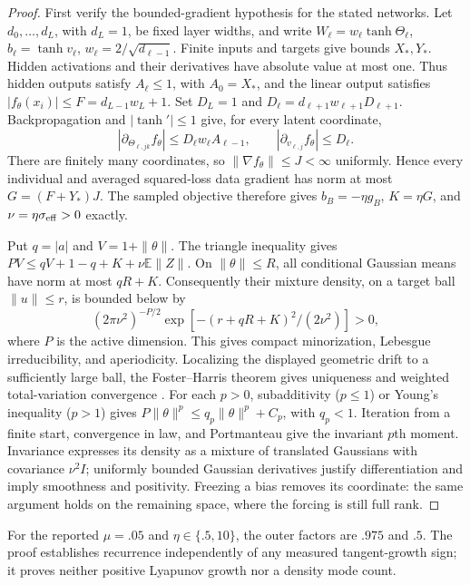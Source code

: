 \begin{proof}
First verify the bounded-gradient hypothesis for the stated networks.
Let $d_0,\ldots,d_L$, with $d_L=1$, be fixed layer widths, and write
$W_\ell=w_\ell\tanh\Theta_\ell$, $b_\ell=\tanh v_\ell$,
$w_\ell=2/\sqrt{d_{\ell-1}}$.
Finite inputs and targets give bounds $X_*,Y_*$. Hidden activations
and their derivatives have absolute value at most one. Thus hidden
outputs satisfy $A_\ell\le1$, with $A_0=X_*$, and the linear output
satisfies $|f_\theta(x_i)|\le F=d_{L-1}w_L+1$.
Set $D_L=1$ and $D_\ell=d_{\ell+1}w_{\ell+1}D_{\ell+1}$.
Backpropagation and $|\tanh'|\le1$ give, for every latent coordinate,
\[
 |\partial_{\Theta_{\ell,jk}}f_\theta|
 \le D_\ell w_\ell A_{\ell-1},\qquad
 |\partial_{v_{\ell,j}}f_\theta|\le D_\ell.
\]
There are finitely many coordinates, so $\|\nabla f_\theta\|\le J<\infty$
uniformly. Hence every individual and averaged squared-loss data gradient
has norm at most $G=(F+Y_*)J$.
The sampled objective therefore gives $b_B=-\eta g_B$, $K=\eta G$,
and $\nu=\eta\sigma_{\rm eff}>0$ exactly.

Put $q=|a|$ and $V=1+\|\theta\|$. The triangle inequality gives
$PV\le qV+1-q+K+\nu\mathbb E\|Z\|$.
On $\|\theta\|\le R$, all conditional Gaussian means have norm at
most $qR+K$. Consequently their mixture density, on a target ball
$\|u\|\le r$, is bounded below by
\[
 (2\pi\nu^2)^{-P/2}
 \exp[-(r+qR+K)^2/(2\nu^2)]>0,
\]
where $P$ is the active dimension. This gives compact minorization,
Lebesgue irreducibility, and aperiodicity. Localizing the displayed
geometric drift to a sufficiently large ball, the Foster--Harris theorem
gives uniqueness and weighted total-variation convergence
\citep{hairermattingly2011}.
For each $p>0$, subadditivity ($p\le1$) or Young's inequality ($p>1$)
gives $P\|\theta\|^p\le q_p\|\theta\|^p+C_p$, with $q_p<1$.
Iteration from a finite start, convergence in law, and Portmanteau give
the invariant $p$th moment. Invariance expresses its density as a mixture
of translated Gaussians with covariance $\nu^2I$; uniformly bounded
Gaussian derivatives justify differentiation and imply smoothness and
positivity. Freezing a bias removes its coordinate: the same argument
holds on the remaining space, where the forcing is still full rank.
\end{proof}

For the reported $\mu=.05$ and $\eta\in\{.5,10\}$, the outer factors
are $.975$ and $.5$. The proof establishes recurrence independently of
any measured tangent-growth sign; it proves neither positive Lyapunov
growth nor a density mode count.
